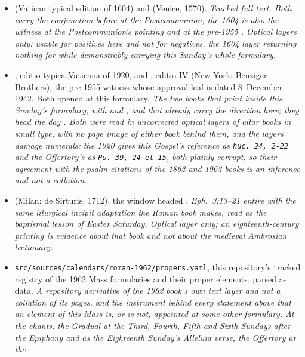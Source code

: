 \begin{itemize}[leftmargin=1.2em, itemsep=0.15em]
\ifdefined\TriptychSynthesisEdition\else
\item {} (Vatican typical edition of 1604) and
 (Venice, 1570). \textit{Tracked full text. Both carry the
conjunction  before  at the Postcommunion; the 1604 is
also the witness at the Postcommunion's pointing and at the pre-1955
. Optical layers only: usable for positives here and not for
negatives, the 1604 layer returning nothing for  while
demonstrably carrying this Sunday's whole formulary.}
\fi
\item {}, editio typica Vaticana of 1920, and
, editio IV  (New York:
Benziger Brothers), the pre-1955 witness whose approval leaf is dated 8~December
1942. Both opened at this formulary. \textit{The two books that print
 inside this
Sunday's formulary, with  and , and that already carry the direction  here; they head the day . Both were
read in uncorrected optical layers of altar books in small type, with no page
image of either book behind them, and the layers damage numerals: the
1920 gives this Gospel's reference as \texttt{huc. 24, 2-22} and the Offertory's
as \texttt{Ps. 39, 24 et 15}, both plainly corrupt, so their agreement with the
psalm citations of the 1862 and 1962 books is an inference and not a
collation.}
\item {} (Milan: de Sirturis, 1712), the window headed
. \textit{Eph.~3:13--21 entire with
the same liturgical incipit adaptation the Roman book makes, read as the
baptismal lesson of Easter Saturday. Optical layer only; an eighteenth-century
printing is evidence about that book and not about the medieval Ambrosian
lectionary.}
\item \texttt{src/sources/calendars/roman-1962/propers.yaml}, this repository's
tracked registry of the 1962 Mass formularies and their proper elements, parsed
as data. \textit{A repository derivative of the 1962 book's own text layer and
not a collation of its pages, and the instrument behind every statement above
that an element of this Mass is, or is not, appointed at some other formulary.
At the chants: the Gradual at the Third, Fourth, Fifth and Sixth Sundays after
the Epiphany and as the Eighteenth Sunday's Alleluia verse, the Offertory at the
}
\end{itemize}
